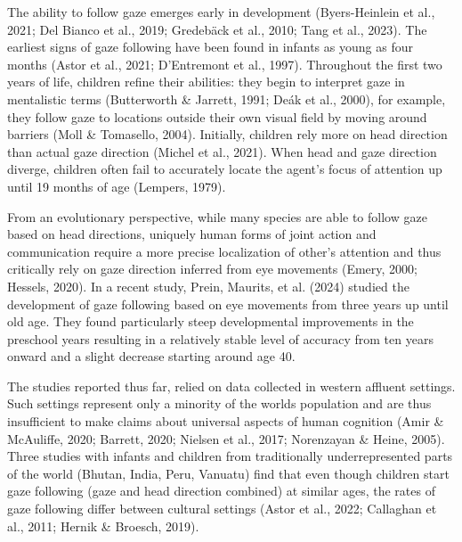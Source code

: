 \documentclass[
  man,floatsintext]{apa7}
\begin{document}
The ability to follow gaze emerges early in development (Byers-Heinlein et al., 2021; Del Bianco et al., 2019; Gredebäck et al., 2010; Tang et al., 2023). The earliest signs of gaze following have been found in infants as young as four months (Astor et al., 2021; D'Entremont et al., 1997). Throughout the first two years of life, children refine their abilities: they begin to interpret gaze in mentalistic terms (Butterworth \& Jarrett, 1991; Deák et al., 2000), for example, they follow gaze to locations outside their own visual field by moving around barriers (Moll \& Tomasello, 2004). Initially, children rely more on head direction than actual gaze direction (Michel et al., 2021). When head and gaze direction diverge, children often fail to accurately locate the agent's focus of attention up until 19 months of age (Lempers, 1979).

From an evolutionary perspective, while many species are able to follow gaze based on head directions, uniquely human forms of joint action and communication require a more precise localization of other's attention and thus critically rely on gaze direction inferred from eye movements (Emery, 2000; Hessels, 2020). In a recent study, Prein, Maurits, et al. (2024) studied the development of gaze following based on eye movements from three years up until old age. They found particularly steep developmental improvements in the preschool years resulting in a relatively stable level of accuracy from ten years onward and a slight decrease starting around age 40.

The studies reported thus far, relied on data collected in western affluent settings. Such settings represent only a minority of the worlds population and are thus insufficient to make claims about universal aspects of human cognition (Amir \& McAuliffe, 2020; Barrett, 2020; Nielsen et al., 2017; Norenzayan \& Heine, 2005). Three studies with infants and children from traditionally underrepresented parts of the world (Bhutan, India, Peru, Vanuatu) find that even though children start gaze following (gaze and head direction combined) at similar ages, the rates of gaze following differ between cultural settings (Astor et al., 2022; Callaghan et al., 2011; Hernik \& Broesch, 2019).
\end{document}
